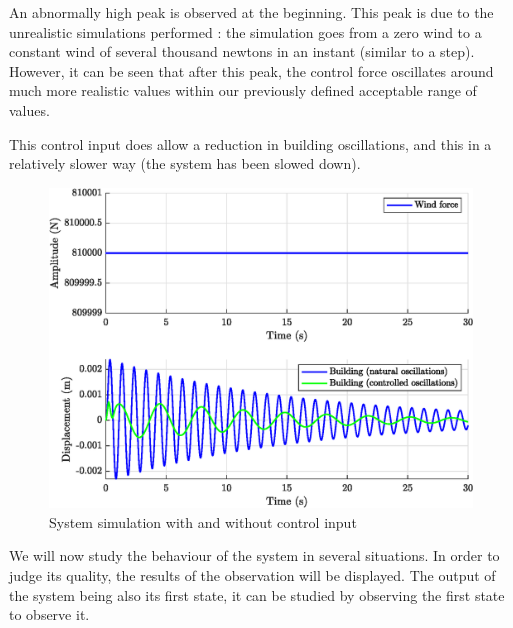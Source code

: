 An abnormally high peak is observed at the beginning. This peak is due to the unrealistic simulations performed : the simulation goes from a zero wind to a constant wind of several thousand newtons in an instant (similar to a step). However, it can be seen that after this peak, the control force oscillates around much more realistic values within our previously defined acceptable range of values.\par
This control input does allow a reduction in building oscillations, and this in a relatively slower way (the system has been slowed down).
\begin{figure}[H]
    \centering
    \includegraphics[width=\textwidth]{resources/eps/controller.eps}
    \caption{System simulation with and without control input}
\end{figure}
We will now study the behaviour of the system in several situations. In order to judge its quality, the results of the observation will be displayed. The output of the system being also its first state, it can be studied by observing the first state to observe it.

